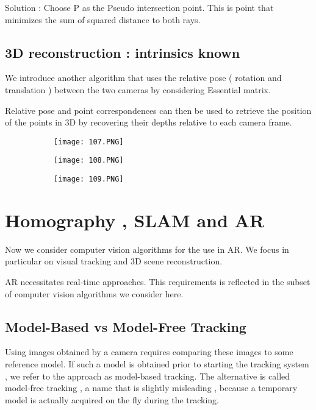 \documentclass{article}
\begin{document}
Solution : Choose P as the Pseudo intersection point. This is point that minimizes the sum of squared distance to both rays.

\subsection{3D reconstruction : intrinsics known }

We introduce another algorithm that uses the relative pose ( rotation and translation ) between the two cameras by considering Essential matrix.

Relative pose and point correspondences can then be used to retrieve the position of the points in 3D by recovering their depths relative to each camera frame.

\begin{figure}[ht!]
  \centering
  \begin{subfigure}[b]{0.4\linewidth}
    \texttt{[image: 107.PNG]}
  \end{subfigure}
  \begin{subfigure}[b]{0.4\textwidth}
         \centering
         \texttt{[image: 108.PNG]}
     \end{subfigure}
\end{figure}

\begin{figure}[ht!]
  \centering
  \begin{subfigure}[b]{0.4\linewidth}
    \texttt{[image: 109.PNG]}
  \end{subfigure}
\end{figure}


\section{Homography , SLAM and AR}

Now we consider computer vision algorithms for the use in AR. We focus in particular on visual tracking and 3D scene reconstruction.

AR necessitates real-time approaches. This requirements is reflected in the subset of computer vision algorithms we consider here.

\subsection{Model-Based vs Model-Free Tracking}

Using images obtained by a camera requires comparing these images to some reference model.
If such a model is obtained prior to starting the tracking system , we refer to the approach as model-based tracking.
The alternative is called model-free tracking , a name that is slightly misleading , because a temporary model is actually acquired on the fly during the tracking.
\end{document}
